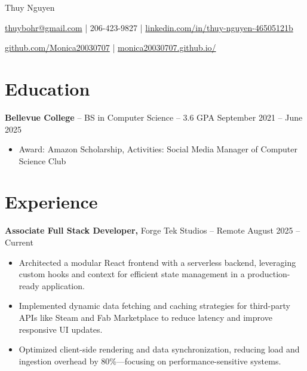 \documentclass[11pt]{article}       %
\begin{document}
\centerline{\Huge Thuy Nguyen}

\vspace{5pt}

\centerline{\href{mailto:thuybohr@gmail.com}{thuybohr@gmail.com} | 206-423-9827 |
\href{https://www.linkedin.com/in/thuy-nguyen-46505121b/}{linkedin.com/in/thuy-nguyen-46505121b}}

\centerline{\href{https://github.com/Monica20030707}{github.com/Monica20030707} | 
\href{https://monica20030707.github.io/}{monica20030707.github.io/}} 

\vspace{-9pt}

\section*{Education}
\textbf{Bellevue College} -- BS in Computer Science -- 3.6 GPA \hfill September 2021 -- June 2025\\
\vspace{-9pt}
\begin{itemize}
  \item Award: Amazon Scholarship, Activities: Social Media Manager of Computer Science Club
\end{itemize}

\vspace{-18.5pt}

\section*{Experience}

\textbf{Associate Full Stack Developer,} {Forge Tek Studios} -- Remote \hfill August 2025 -- Current 
\vspace{-9pt}
\begin{itemize}
  \item Architected a modular React frontend with a serverless backend, leveraging custom hooks and context for efficient state management in a production-ready application.
  \item Implemented dynamic data fetching and caching strategies for third-party APIs like Steam and Fab Marketplace to reduce latency and improve responsive UI updates.
  \item Optimized client-side rendering and data synchronization, reducing load and ingestion overhead by 80\%—focusing on performance-sensitive systems.
\end{itemize}
\end{document}
